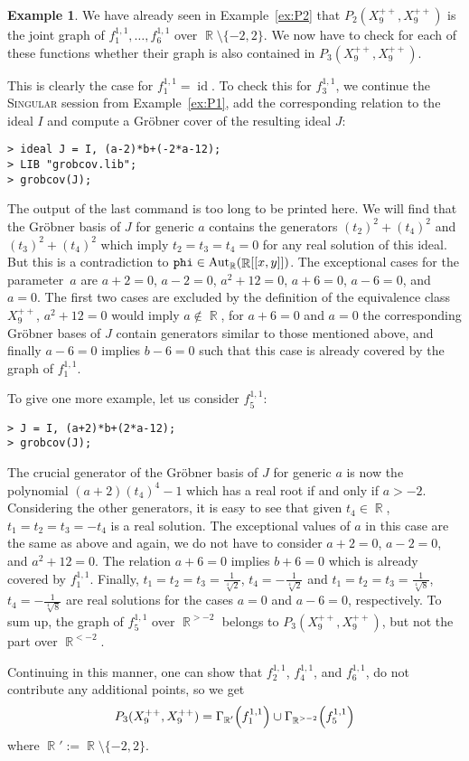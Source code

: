 \documentclass[noend]{amsproc}
\theoremstyle{definition}
\newtheorem{example}[theorem]{Example}
\let\originalleft\left
\let\originalright\right
\renewcommand{\left}{\mathopen{}\mathclose\bgroup\originalleft}
\renewcommand{\right}{\aftergroup\egroup\originalright}
\newcommand{\Singular}{\textsc{Singular}}
\DeclareMathOperator{\R}{\mathbb{R}}
\DeclareMathOperator{\Aut}{Aut}
\DeclareMathOperator{\id}{id}
\begin{document}
\begin{example}
We have already seen in Example~\ref{ex:P2} that
$P_2(X_9^{++}, X_9^{++})$ is the joint graph of
$f_1^{1,1}, \ldots, f_6^{1,1}$ over $\R \setminus \{-2, 2\}$. We now have to
check for each of these functions whether their graph is also contained in
$P_3(X_9^{++}, X_9^{++})$.

This is clearly the case for $f_1^{1,1} = \id$. To check this for $f_3^{1,1}$,
we continue the \Singular{} session from Example~\ref{ex:P1}, add the
corresponding relation to the ideal $I$ and compute a Gr\"obner cover of the
resulting ideal $J$:
\begin{verbatim}
> ideal J = I, (a-2)*b+(-2*a-12);
> LIB "grobcov.lib";
> grobcov(J);
\end{verbatim}
The output of the last command is too long to be printed here. We will find
that the Gr\"obner basis of $J$ for generic $a$ contains the generators
$(t_2)^2+(t_4)^2$ and $(t_3)^2+(t_4)^2$ which imply $t_2 = t_3 = t_4 = 0$ for
any real solution of this ideal. But this is a contradiction to
$\verb+phi+ \in \Aut_{\R}(\R[[x,y]])$. The exceptional cases for the
parameter~$a$ are $a+2=0$, $a-2=0$, $a^2+12=0$, $a+6=0$, $a-6=0$, and $a=0$.
The first two cases are excluded by the definition of the equivalence class
$X_9^{++}$, $a^2+12=0$ would imply $a \not\in \R$, for $a+6=0$ and $a=0$ the
corresponding Gr\"obner bases of $J$ contain generators similar to those
mentioned above, and finally $a-6=0$ implies $b-6=0$ such that this case is
already covered by the graph of $f_1^{1,1}$.

To give one more example, let us consider $f_5^{1,1}$:
\begin{verbatim}
> J = I, (a+2)*b+(2*a-12);
> grobcov(J);
\end{verbatim}
The crucial generator of the Gr\"obner basis of $J$ for generic $a$ is now the
polynomial $(a+2)(t_4)^4-1$ which has a real root if and only if $a > -2$.
Considering the other generators, it is easy to see that given $t_4 \in \R$,
$t_1 = t_2 = t_3 = -t_4$ is a real solution. The exceptional values
of $a$ in this case are the same as above and again, we do not have to consider
$a+2=0$, $a-2=0$, and $a^2+12=0$. The relation $a+6=0$ implies $b+6=0$ which is
already covered by $f_1^{1,1}$. Finally,
$t_1 = t_2 = t_3 = \frac{1}{\sqrt[4]{2}}$, $t_4 = -\frac{1}{\sqrt[4]{2}}$ and
$t_1 = t_2 = t_3 = \frac{1}{\sqrt[4]{8}}$, $t_4 = -\frac{1}{\sqrt[4]{8}}$ are
real solutions for the cases $a=0$ and $a-6=0$, respectively. To sum up,
the graph of $f_5^{1,1}$ over $\R^{>-2}$ belongs to $P_3(X_9^{++}, X_9^{++})$,
but not the part over $\R^{<-2}$.

Continuing in this manner, one can show that $f_2^{1,1}$, $f_4^{1,1}$, and
$f_6^{1,1}$, do not contribute any additional points, so we get
\[
P_3(X_9^{++}, X_9^{++}) = \Gamma_{\R'} \left(f_1^{1,1}\right)
\cup \Gamma_{\R^{>-2}} \left(f_5^{1,1}\right)
\]
where $\R' := \R \setminus \{-2, 2\}$.
\end{example}
\end{document}
